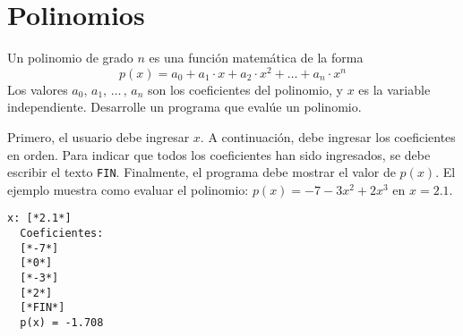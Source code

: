 \section{Polinomios}
  Un polinomio de grado \(n\)
  es una función matemática de la forma
  \begin{equation*}
    p(x) = a_0
      + a_1 \cdot x
      + a_2 \cdot x^2
      + \hdots
      + a_n \cdot x^n
  \end{equation*}
  Los valores \(a_0, \, a_1, \, \hdots \, , \, a_n\)
  son los coeficientes del polinomio,
  y \(x\) es la variable independiente.
  Desarrolle un programa que evalúe un polinomio.
  
  Primero,
  el usuario debe ingresar \(x\).
  A continuación,
  debe ingresar los coeficientes en orden.
  Para indicar que todos los coeficientes han sido ingresados,
  se debe escribir el texto \texttt{FIN}.
  Finalmente,
  el programa debe mostrar el valor de \(p(x)\).
  El ejemplo muestra como evaluar el polinomio:
  \(p(x) = -7 - 3x^2 + 2x^3\) en \(x = 2.1\).
  
  \begin{lstlisting}[style=consola]
  x: [*2.1*]
  Coeficientes:
  [*-7*]
  [*0*]
  [*-3*]
  [*2*]
  [*FIN*]
  p(x) = -1.708
  \end{lstlisting}
  
  \pagebreak[4]